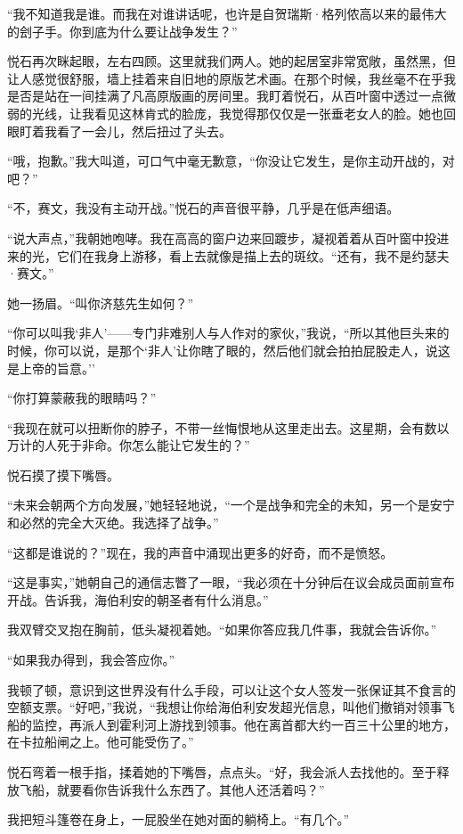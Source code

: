 \documentclass[AutoFakeBold=true]{book}
\begin{document}
``我不知道我是谁。而我在对谁讲话呢，也许是自贺瑞斯·格列侬高以来的最伟大的刽子手。你到底为什么要让战争发生？''

悦石再次眯起眼，左右四顾。这里就我们两人。她的起居室非常宽敞，虽然黑，但让人感觉很舒服，墙上挂着来自旧地的原版艺术画。在那个时候，我丝毫不在乎我是否是站在一间挂满了凡高原版画的房间里。我盯着悦石，从百叶窗中透过一点微弱的光线，让我看见这林肯式的脸庞，我觉得那仅仅是一张垂老女人的脸。她也回眼盯着我看了一会儿，然后扭过了头去。

``哦，抱歉。''我大叫道，可口气中毫无歉意，``你没让它发生，是你主动开战的，对吧？''

``不，赛文，我没有主动开战。''悦石的声音很平静，几乎是在低声细语。

``说大声点，''我朝她咆哮。我在高高的窗户边来回踱步，凝视着着从百叶窗中投进来的光，它们在我身上游移，看上去就像是描上去的斑纹。``还有，我不是约瑟夫·赛文。''

她一扬眉。``叫你济慈先生如何？''

``你可以叫我`非人'——专门非难别人与人作对的家伙，''我说，``所以其他巨头来的时候，你可以说，是那个`非人'让你瞎了眼的，然后他们就会拍拍屁股走人，说这是上帝的旨意。''

``你打算蒙蔽我的眼睛吗？''

``我现在就可以扭断你的脖子，不带一丝悔恨地从这里走出去。这星期，会有数以万计的人死于非命。你怎么能让它发生的？''

悦石摸了摸下嘴唇。

``未来会朝两个方向发展，''她轻轻地说，``一个是战争和完全的未知，另一个是安宁和必然的完全大灭绝。我选择了战争。''

``这都是谁说的？''现在，我的声音中涌现出更多的好奇，而不是愤怒。

``这是事实，''她朝自己的通信志瞥了一眼，``我必须在十分钟后在议会成员面前宣布开战。告诉我，海伯利安的朝圣者有什么消息。''

我双臂交叉抱在胸前，低头凝视着她。``如果你答应我几件事，我就会告诉你。''

``如果我办得到，我会答应你。''

我顿了顿，意识到这世界没有什么手段，可以让这个女人签发一张保证其不食言的空额支票。``好吧，''我说，``我想让你给海伯利安发超光信息，叫他们撤销对领事飞船的监控，再派人到霍利河上游找到领事。他在离首都大约一百三十公里的地方，在卡拉船闸之上。他可能受伤了。''

悦石弯着一根手指，揉着她的下嘴唇，点点头。``好，我会派人去找他的。至于释放飞船，就要看你告诉我什么东西了。其他人还活着吗？''

我把短斗篷卷在身上，一屁股坐在她对面的躺椅上。``有几个。''
\end{document}
